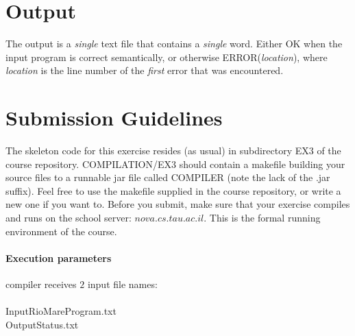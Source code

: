 \documentclass{article}
\begin{document}
\section{Output}
The output is a \textit{single} text file that contains a \textit{single} word.
Either OK when the input program is correct semantically,
or otherwise ERROR(\textit{location}), where \textit{location}
is the line number of the \textit{first} error that was encountered.

\section{Submission Guidelines}
The skeleton code for this exercise resides (as usual)
in subdirectory EX3 of the course repository.
COMPILATION/EX3 should contain a makefile building your source files to a
runnable jar file called COMPILER (note the lack of the .jar suffix).
Feel free to use the makefile supplied in the course repository,
or write a new one if you want to. 
Before you submit, make sure that your exercise compiles and runs
on the school server: $nova.cs.tau.ac.il$.
This is the formal running environment of the course.

\paragraph{Execution parameters}
compiler receives $2$ input file names:\\ \\
InputRioMareProgram.txt\\
OutputStatus.txt
\end{document}
